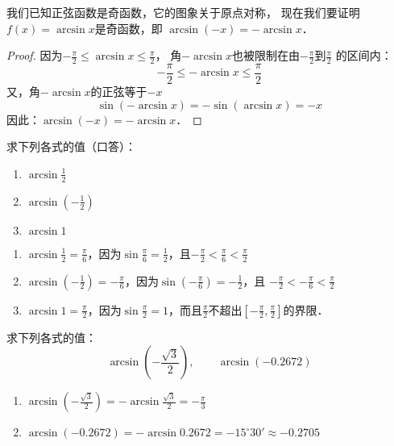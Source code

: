 我们已知正弦函数是奇函数，它的图象关于原点对称，
现在我们要证明 $f(x)=\arcsin x$是奇函数，即
$\arcsin(-x)=-\arcsin x$．

\begin{proof}
    因为$-\frac{\pi}{2}\le \arcsin x\le \frac{\pi}{2}$，
    角$-\arcsin x$也被限制在由$-\frac{\pi}{2}$到$\frac{\pi}{2}$
    的区间内：
    $$-\frac{\pi}{2}\le -\arcsin x\le \frac{\pi}{2}$$
    又，角$-\arcsin x$的正弦等于$-x$
\[\sin(-\arcsin x)=-\sin(\arcsin x)=-x\]
因此：$\arcsin(-x)=-\arcsin x$．
\end{proof}

\begin{example}
    求下列各式的值（口答）：
    \begin{enumerate}
        \item $\arcsin\frac{1}{2}$
        \item $\arcsin\left(-\frac{1}{2}\right)$
        \item $\arcsin 1$
    \end{enumerate}
\end{example}

\begin{solution}
\begin{enumerate}
    \item $\arcsin\frac{1}{2}=\frac{\pi}{6}$，因为$\sin\frac{\pi}{6}=\frac{1}{2}$，且$-\frac{\pi}{2}<\frac{\pi}{6}<\frac{\pi}{2}$

    \item $\arcsin\left(-\frac{1}{2}\right)=-\frac{\pi}{6}$，因为$\sin\left(-\frac{\pi}{6}\right)=-\frac{1}{2}$，且
    $-\frac{\pi}{2}<-\frac{\pi}{6}<\frac{\pi}{2}$
    \item $\arcsin 1=\frac{\pi}{2}$，因为$\sin\frac{\pi}{2}=1$，而且$\frac{\pi}{2}$不超出$\left[-\frac{\pi}{2},\frac{\pi}{2}\right]$的界限．
\end{enumerate}
\end{solution}

\begin{example}
    求下列各式的值：
\[\arcsin\left(-\frac{\sqrt{3}}{2}\right),\qquad \arcsin (-0.2672) \]
\end{example}

\begin{solution}
\begin{enumerate}
    \item $\arcsin\left(-\frac{\sqrt{3}}{2}\right)=-\arcsin\frac{\sqrt{3}}{2}=-\frac{\pi}{3}$
    \item $\arcsin(-0.2672)=-\arcsin0.2672=-15^{\circ}30'\approx -0.2705$
\end{enumerate}
    
\end{solution}



